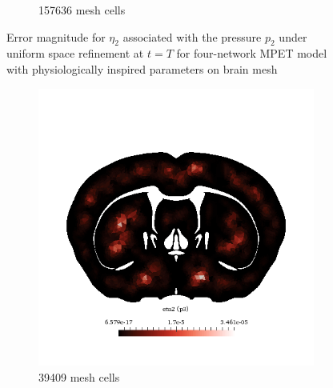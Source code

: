 \begin{figure}[h!]
\begin{subfigure}[b]{0.49\textwidth}
    \caption{157636 mesh cells}
  \end{subfigure}
  \caption{Error magnitude for $\eta_2$ associated with the pressure $p_2$ under uniform space refinement at $t=T$ for four-network MPET model with physiologically inspired parameters on brain mesh} \label{fig:mpet4_eta2_p2}
\end{figure}

\begin{figure}[h!]
  \centering
    \begin{subfigure}[b]{0.49\textwidth}
    \includegraphics[width=\textwidth,height=\textheight,keepaspectratio,height=\textheight,keepaspectratio]{figures/4_mpet/biomedical/space/eta2_p3_1.png}
    \caption{39409 mesh cells}
  \end{subfigure}
  \begin{subfigure}[b]{0.49\textwidth}

\end{subfigure}
\end{figure}
